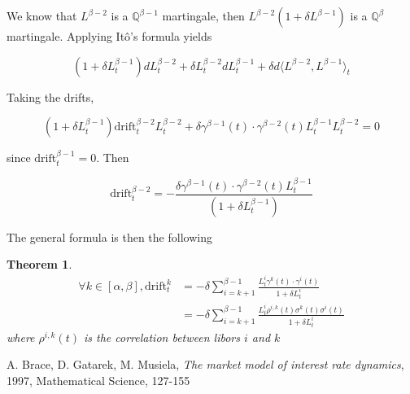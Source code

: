 \documentclass{article}
\newtheorem{theorem}{Theorem}[section]
\begin{document}
\noindent We know that $L^{\beta-2}$ is a $\mathbb{Q}^{\beta-1}$ martingale, then $L^{\beta-2} \left(1 + \delta L^{\beta-1}\right)$ is a $\mathbb{Q}^{\beta}$ martingale. Applying Itô's formula yields

\begin{equation*}
	\left(1 + \delta L^{\beta-1}_t\right) dL^{\beta-2} _t + \delta L^{\beta-2}_t dL^{\beta-1}_t + \delta d\langle L^{\beta-2}, L^{\beta-1}\rangle_t
\end{equation*}

\noindent Taking the drifts,

\begin{equation*}
	\left(1 + \delta L^{\beta-1}_t\right) \text{drift}^{\beta-2}_t L^{\beta-2}_t+ \delta \gamma^{\beta-1}(t)\cdot\gamma^{\beta-2}(t)  L^{\beta-1}_t L^{\beta-2}_t= 0
\end{equation*}

\noindent since $\text{drift}_t^{\beta-1} = 0$. Then

\begin{equation}
	\text{drift}^{\beta-2}_t = -\frac{\delta \gamma^{\beta-1}(t)\cdot\gamma^{\beta-2}(t)  L^{\beta-1}_t}{\left(1 + \delta L^{\beta-1}_t\right)}	
\end{equation}

The general formula is then the following

\begin{theorem}
	\begin{equation}
	\begin{aligned}
		\forall k \in [\alpha,\beta], \text{drift}_t^k &= -\delta \sum_{i=k+1}^{\beta-1} \frac{L_t^i \gamma^k(t) \cdot \gamma^i(t)}{1 + \delta L_t^i}\\
		&= -\delta \sum_{i=k+1}^{\beta-1} \frac{L_t^i \rho^{i,k}(t)\sigma^k(t) \sigma^i(t)}{1 + \delta L_t^i}
	\end{aligned}
	\end{equation}
	where $\rho^{i,k}(t)$ is the correlation between libors $i$ and $k$
\end{theorem}

\begin{thebibliography}{9}
	A. Brace, D. Gatarek, M. Musiela, \emph{The market model of interest rate dynamics}, 1997, Mathematical Science, 127-155
\end{thebibliography}
\end{document}
